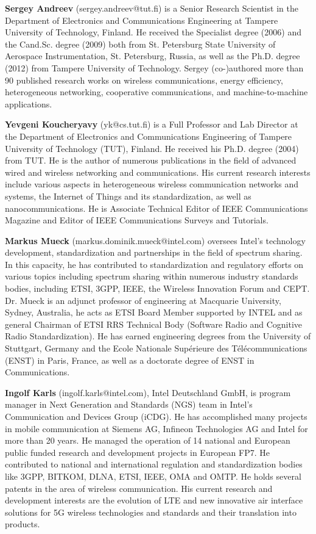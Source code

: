 \documentclass[journal]{IEEEtran}
\begin{document}
\textbf{Sergey Andreev} (sergey.andreev@tut.fi) is a Senior Research Scientist in the Department of Electronics and Communications Engineering at Tampere University of Technology, Finland. He received the Specialist degree (2006) and the Cand.Sc. degree (2009) both from St. Petersburg State University of Aerospace Instrumentation, St. Petersburg, Russia, as well as the Ph.D. degree (2012) from Tampere University of Technology. Sergey (co-)authored more than 90 published research works on wireless communications, energy efficiency, heterogeneous networking, cooperative communications, and machine-to-machine applications.

\textbf{Yevgeni Koucheryavy} (yk@cs.tut.fi) is a Full Professor and Lab Director at the Department of Electronics and Communications Engineering of Tampere University of Technology (TUT), Finland. He received his Ph.D. degree (2004) from TUT. He is the author of numerous publications in the field of advanced wired and wireless networking and communications. His current research interests include various aspects in heterogeneous wireless communication networks and systems, the Internet of Things and its standardization, as well as nanocommunications. He is Associate Technical Editor of IEEE Communications Magazine and Editor of IEEE Communications Surveys and Tutorials.

\textbf{Markus Mueck} (markus.dominik.mueck@intel.com) oversees Intel's technology development, standardization and partnerships in the field of spectrum sharing. In this capacity, he has contributed to standardization and regulatory efforts on various topics including spectrum sharing within numerous industry standards bodies, including ETSI, 3GPP, IEEE, the Wireless Innovation Forum and CEPT. Dr. Mueck is an adjunct professor of engineering at Macquarie University, Sydney, Australia, he acts as ETSI Board Member supported by INTEL and as general Chairman of ETSI RRS Technical Body (Software Radio and Cognitive Radio Standardization). He has earned engineering degrees from the University of Stuttgart, Germany and the Ecole Nationale Sup\'{e}rieure des T\'{e}l\'{e}communications (ENST) in Paris, France, as well as a doctorate degree of ENST in Communications.

\textbf{Ingolf Karls} (ingolf.karls@intel.com), Intel Deutschland GmbH, is program manager in Next Generation and Standards (NGS) team in Intel's Communication and Devices Group (iCDG). He has accomplished many projects in mobile communication at Siemens AG, Infineon Technologies AG and Intel for more than 20 years. He managed the operation of 14 national and European public funded research and development projects in European FP7. He contributed to national and international regulation and standardization bodies like 3GPP, BITKOM, DLNA, ETSI, IEEE, OMA and OMTP. He holds several patents in the area of wireless communication. His current research and development interests are the evolution of LTE and new innovative air interface solutions for 5G wireless technologies and standards and their translation into products.
\end{document}
